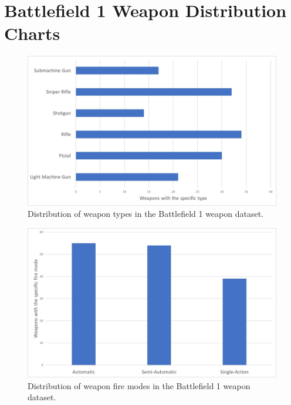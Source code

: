 \documentclass[MGS,Master,english]{twbook}%
\begin{document}
\chapter{Battlefield 1 Weapon Distribution Charts} \label{bf1::data::distributionCharts}
\begin{figure}[!ht]
	\centering
	\includegraphics[width=0.8\linewidth]{PICs/weapon_type_distribution_chart}
	\caption{Distribution of weapon types in the Battlefield 1 weapon dataset.}
\end{figure}
\begin{figure}[!ht]
	\centering
	\includegraphics[width=0.8\linewidth]{PICs/weapon_fire_mode_distribution_chart}
	\caption{Distribution of weapon fire modes in the Battlefield 1 weapon dataset.}
\end{figure}
\end{document}
